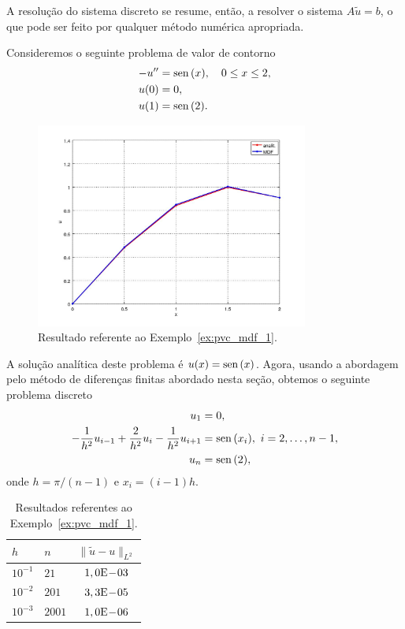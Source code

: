 A resolução do sistema discreto se resume, então, a resolver o sistema $A\tilde{u} = b$, o que pode ser feito por qualquer método numérica apropriada.


\begin{ex}\label{ex:pvc_mdf_1}
  Consideremos o seguinte problema de valor de contorno
  \begin{align}
    -u'' &= \operatorname{sen}\,(x),\quad 0\leq x \leq 2,\\
    u(0) &= 0,\\
    u(1) &= \operatorname{sen}\,(2).
  \end{align}

\begin{figure}[h!]
  \centering
  \includegraphics[width=0.8\textwidth]{./cap_pvc/dados/ex_pvc_mdf_1/ex_pvc_mdf_1}
  \caption{Resultado referente ao Exemplo~\ref{ex:pvc_mdf_1}.}
  \label{fig:ex_pvc_mdf_1}
\end{figure}

A solução analítica deste problema é $u(x) = \operatorname{sen}\,(x)$. Agora, usando a abordagem pelo método de diferenças finitas abordado nesta seção, obtemos o seguinte problema discreto
\begin{align}
  u_1 &= 0,\\
  -\frac{1}{h^2}u_{i-1} + \frac{2}{h^2}u_i - \frac{1}{h^2}u_{i+1} &= \operatorname{sen}\,(x_i),~i=2, \dotsc, n-1,\\
  u_n &= \operatorname{sen}\,(2),
\end{align}
onde $h=\pi/(n-1)$ e $x_i = (i-1)h$.

\begin{table}[h!]
  \centering
  \begin{tabular}{ll|c}
    $h$ & $n$ & $\|\tilde{u} - u\|_{L^2}$ \\\hline
    $10^{-1}$ & $21$ & $1,0\mathrm{E}\!-\!03$ \\
    $10^{-2}$ & $201$ & $3,3\mathrm{E}\!-\!05$ \\
    $10^{-3}$ & $2001$ & $1,0\mathrm{E}\!-\!06$ \\\hline
  \end{tabular}
  \caption{Resultados referentes ao Exemplo~\ref{ex:pvc_mdf_1}.}
  \label{tab:ex_pvc_mdf_1}
\end{table}


\end{ex}
